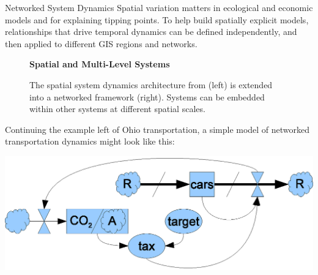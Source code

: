 \documentclass[final]{beamer}
\newlength{\onecolwid}
\newlength{\twocolwid}
\begin{document}
\begin{frame}[fragile]
\begin{columns}[t]
\begin{column}{\twocolwid}
\begin{columns}[t]
\begin{column}{\onecolwid}
      \begin{alertblock}{Networked System Dynamics}     
        Spatial variation matters in ecological and economic models
        and for explaining tipping points.  To help build spatially
        explicit models, relationships that drive temporal dynamics
        can be defined independently, and then applied to different
        GIS regions and networks.

        \begin{figure}[h]
          {\bf Spatial and Multi-Level Systems}

          \vspace{.1cm}
         \caption*{The spatial system dynamics architecture from
            \cite{ahmad2004spatial} (left) is extended into a
            networked framework (right).  Systems can be embedded
            within other systems at different spatial scales.}
        \end{figure}

        Continuing the example left of Ohio transportation, a simple
        model of networked transportation dynamics might look like
        this:

        \includegraphics[width=\textwidth]{ohiomod.eps}


\end{alertblock}
\end{column}
\end{columns}
\end{column}
\end{columns}
\end{frame}
\end{document}
